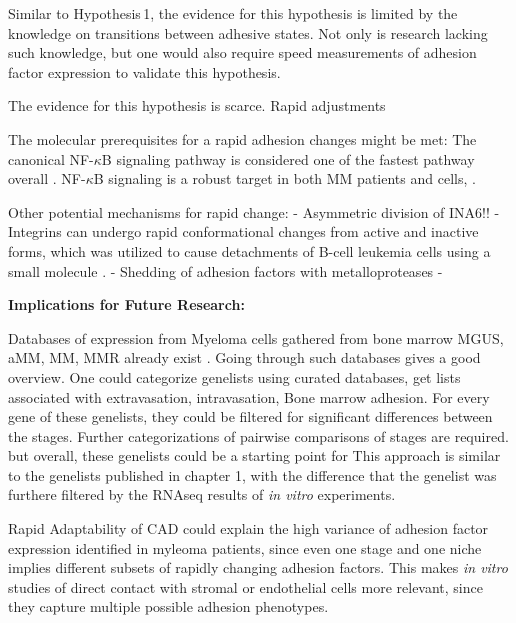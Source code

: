 Similar to Hypothesis\,1, the evidence for this hypothesis is limited by
the knowledge on transitions between adhesive states. Not only is research lacking
such knowledge, but one would also require speed measurements of adhesion factor
expression to validate this hypothesis.

The
evidence for this hypothesis is scarce.
Rapid adjustments



The molecular prerequisites  for a rapid adhesion changes might be met:
The
canonical NF-$\kappa$B signaling pathway is considered one of the fastest
pathway overall \cite{gallego-sellesFastRegulationNFkB2022,
    zarnegarNoncanonicalNFkBActivation2008}. NF-$\kappa$B signaling is a
robust target in both MM patients and \INA cells,
\cite{sarinEvaluatingEfficacyMultiple2020}.



Other potential mechanisms for rapid change:
- Asymmetric division of INA6!!
- Integrins can undergo rapid conformational changes from active and inactive
forms, which was utilized to cause detachments of B-cell leukemia cells
using a small molecule \cite{ruanVitroVivoEffects2022}.
- Shedding of adhesion factors with metalloproteases
-



\textbf{Implications for Future Research:}


Databases of expression from Myeloma cells gathered from bone
marrow \ac{MGUS}, \ac{aMM}, \ac{MM}, \ac{MMR} already exist
\citet{akhmetzyanovaDynamicCD138Surface2020,
    seckingerCD38ImmunotherapeuticTarget2018}. Going through such databases gives a
good overview. One could categorize genelists using curated databases, get lists
associated with extravasation, intravasation, Bone marrow adhesion. For every
gene of these genelists, they could be filtered for significant differences
between the stages. Further categorizations of pairwise comparisons of stages
are required. but overall, these genelists could be a starting point for This
approach is similar to the genelists published in chapter 1, with the difference
that the genelist was furthere filtered by the RNAseq results of \textit{in
    vitro} experiments.


Rapid Adaptability of \ac{CAD} could explain the high variance of adhesion
factor expression identified in myleoma patients, since even one stage and one
niche implies different subsets of rapidly changing adhesion factors. This makes
\textit{in vitro} studies of direct contact with stromal or endothelial cells
more relevant, since they capture multiple possible adhesion phenotypes.


